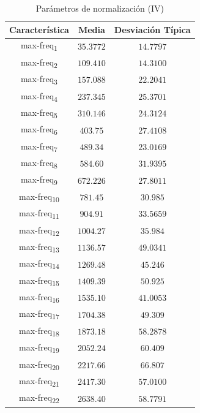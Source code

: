 \documentclass[12pt]{article}
\begin{document}
\begin{table}
	\caption{Parámetros de normalización (IV)}
	\centering
		\begin{tabular}{||c c c||}
			\hline
			Característica & Media & Desviación Típica  \\ [0.5ex]
			\hline\hline
			max-freq\textsubscript{1} & $35.3772$ & $14.7797$ \\
			\hline
			max-freq\textsubscript{2} & $109.410$ & $14.3100$ \\
			\hline
			max-freq\textsubscript{3} & $157.088$ & $22.2041$ \\
			\hline
			max-freq\textsubscript{4} & $237.345$ & $25.3701$ \\
			\hline
			max-freq\textsubscript{5} & $310.146$ & $24.3124$ \\
			\hline
			max-freq\textsubscript{6} & $403.75$ & $27.4108$ \\
			\hline
			max-freq\textsubscript{7} & $489.34$ & $23.0169$ \\
			\hline
			max-freq\textsubscript{8} & $584.60$ & $31.9395$ \\
			\hline
			max-freq\textsubscript{9} & $672.226$ & $27.8011$ \\
			\hline
			max-freq\textsubscript{10} & $781.45$ & $30.985$ \\
			\hline
			max-freq\textsubscript{11} & $904.91$ & $33.5659$ \\
			\hline
			max-freq\textsubscript{12} & $1004.27$ & $35.984$ \\
			\hline
			max-freq\textsubscript{13} & $1136.57$ & $49.0341$ \\
			\hline
			max-freq\textsubscript{14} & $1269.48$ & $45.246$ \\
			\hline
			max-freq\textsubscript{15} & $1409.39$ & $50.925$ \\
			\hline
			max-freq\textsubscript{16} & $1535.10$ & $41.0053$ \\
			\hline
			max-freq\textsubscript{17} & $1704.38$ & $49.309$ \\
			\hline
			max-freq\textsubscript{18} & $1873.18$ & $58.2878$ \\
			\hline
			max-freq\textsubscript{19} & $2052.24$ & $60.409$ \\
			\hline
			max-freq\textsubscript{20} & $2217.66$ & $66.807$ \\
			\hline
			max-freq\textsubscript{21} & $2417.30$ & $57.0100$ \\
			\hline
			max-freq\textsubscript{22} & $2638.40$ & $58.7791$ \\

\end{tabular}
\end{table}
\end{document}
